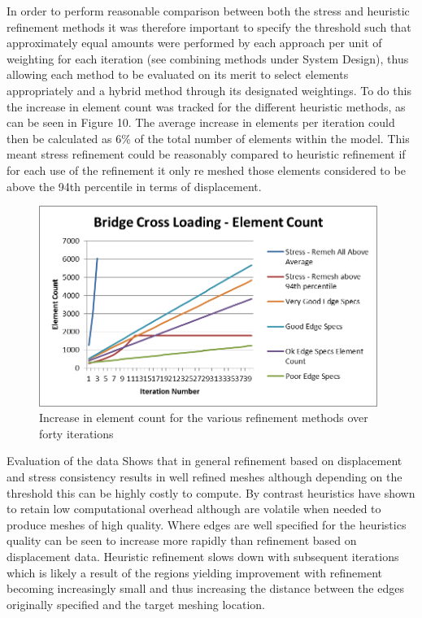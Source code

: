 \noindent
In order to perform reasonable comparison between both the stress and heuristic refinement methods it was therefore important to specify the threshold such that approximately equal amounts were performed by each approach per unit of weighting for each iteration (see combining methods under System Design), thus allowing each method to be evaluated on its merit to select elements appropriately and a hybrid method through its designated weightings. To do this the increase in element count was tracked for the different heuristic methods, as can be seen in Figure 10. The average increase in elements per iteration could then be calculated as 6\% of the total number of elements within the model. This meant stress refinement could be reasonably compared to heuristic refinement if for each use of the refinement it only re meshed those elements considered to be above the 94th percentile in terms of displacement. \\ 


\begin{figure}[!h]
  \centerline{\includegraphics[width=110mm, scale=1]{../Graphics/Graphs/BridgeCrossLoadingElementCount.png}}
  \caption{Increase in element count for the various refinement methods over forty iterations}
  \label{fig:sub1}
\end{figure}

\noindent
Evaluation of the data Shows that in general refinement based on displacement and stress consistency results in well refined meshes although depending on the threshold this can be highly costly to compute. By contrast heuristics have shown to retain low computational overhead although are volatile when needed to produce meshes of high quality. Where edges are well specified for the heuristics quality can be seen to increase more rapidly than refinement based on displacement data. Heuristic refinement slows down with subsequent iterations which is likely a result of the regions yielding improvement with refinement becoming increasingly small and thus increasing the distance between the edges originally specified and the target meshing location. \\

